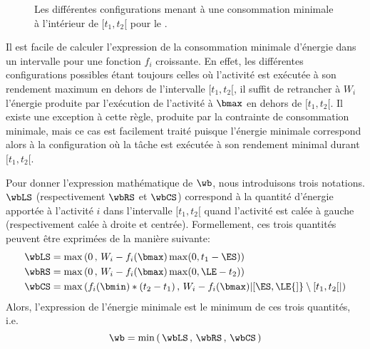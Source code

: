 \begin{figure}[!htb]
{}
  \caption{Les différentes configurations menant à une consommation
    minimale à l'intérieur de $[t_1,t_2[$ pour le \CECSP.}
  \label{fig:conso_CECSP}
\end{figure}

Il est facile de calculer l'expression de la consommation minimale
d'énergie dans un intervalle pour une fonction $f_i$ croissante. En
effet, les différentes configurations possibles étant toujours celles 
où l'activité est exécutée à son rendement maximum en dehors de
l'intervalle ${[}t_1,t_2{[}$, il suffit de retrancher à $W_i$
l'énergie produite par l'exécution de l'activité à $\bmax$ en dehors
de ${[}t_1,t_2{[}$. Il existe une exception à cette règle, produite
par la contrainte de consommation minimale, mais ce cas est facilement
traité puisque l'énergie minimale correspond alors à la configuration
où la tâche est exécutée à son rendement minimal durant
${[}t_1,t_2{[}$.

Pour donner l'expression mathématique de $\wb$, nous introduisons
trois notations. $\wbLS$ (respectivement $\wbRS$ et $\wbCS$)
correspond à la quantité d'énergie apportée à l'activité $i$ dans
l'intervalle $[t_1,t_2[$ quand l'activité est calée à gauche
(respectivement calée à droite et centrée). Formellement, ces trois
quantités peuvent être exprimées de la manière suivante:
\begin{align}
  \wbLS&= \max\left(0\, ,\, W_i- f_i(\bmax)\max(0,t_1 -
         \ES)\right) \label{eq:LSnrj_CECSP}\\
  \wbRS&= \max\left(0\, ,\, W_i- f_i(\bmax)\max(0,
         \LE-t_2)\right)\label{eq:RSnrj_CECSP}\\
  \wbCS&=\max\left( f_i(\bmin) * (t_2-t_1)\, ,\, W_i -
         f_i(\bmax)|[\ES, \LE{]}\setminus[t_1,t_2[|\right)\label{eq:CSnrj_CECSP}
\end{align}
Alors, l'expression de l'énergie minimale est le minimum de ces trois
quantités, i.e.
\begin{equation}
  \wb=\min\left(\, \wbLS\, ,\,\wbRS\, ,\,\wbCS \, \right)
\end{equation} 

